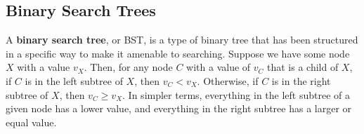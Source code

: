 \begin{comment}
\subsubsection{Binary Trees}
Generally, in a tree each node can have any number of children. A \textbf{binary tree} is a specific type of tree in which each node has at most 2 children.

\begin{figure}
\centering
\begin{tikzpicture}[very thick,level/.style={sibling distance=70mm/#1}]
\node [vertex] (r){\texttt{"a"}}
  child {
    node [vertex] {\texttt{"b"}}
    child {
      node [vertex] {\texttt{"e"}}
    }
  }
  child {
    node [vertex] {\texttt{"d"}}
    child {
      node [vertex] {\texttt{"f"}}
      child {node [vertex] {\texttt{"i"}}}
      child {node [vertex] {\texttt{"h"}}}
    }
    child {
      node [vertex] {\texttt{"g"}}      
    }
  };
\end{tikzpicture}
\label{fig:tree1}
\end{figure}

In the tree above, “a” is the root, and “e”, “g”, “h”, and “i” are leaf nodes because they have no children.

A \textbf{complete binary tree} is a binary tree in which every node has two children (except the leaves of course) and all leaves are found at the same depth. You can think of complete binary trees as being "filled up" because there's no more space to add nodes without increasing the height.
\end{comment}


\subsection{Binary Search Trees}

A \textbf{binary search tree}, or BST, is a type of binary tree that has been structured in a specific way to make it amenable to searching. Suppose we have some node $X$ with a value $v_X$. Then, for any node $C$ with a value of $v_C$ that is a child of $X$, if $C$ is in the left subtree of $X$, then $v_C < v_X$. Otherwise, if $C$ is in the right subtree of $X$, then $v_C \geq v_X$. In simpler terms, everything in the left subtree of a given node has a lower value, and everything in the right subtree has a larger or equal value.


